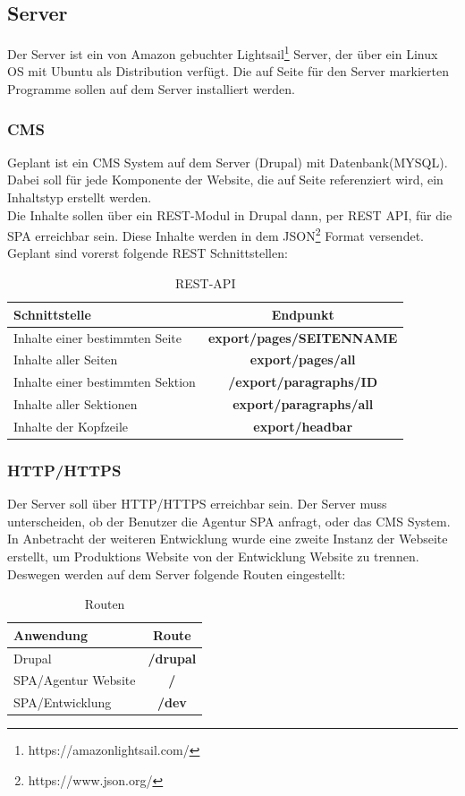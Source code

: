 \documentclass[11pt,a4paper]{article}
\begin{document}
\subsection{Server}
Der Server ist ein von Amazon gebuchter Lightsail\footnote{https://amazonlightsail.com/} Server, der über ein Linux OS mit Ubuntu als Distribution verfügt. Die auf Seite \pageref{sec:progs} für den Server markierten Programme sollen auf dem Server installiert werden.
\subsubsection{CMS}
Geplant ist ein CMS System auf dem Server (Drupal) mit Datenbank(MYSQL).\\ Dabei soll für jede Komponente der Website, die auf Seite \pageref{sec:epage}
referenziert wird, ein Inhaltstyp erstellt werden.\\
Die Inhalte sollen über ein REST-Modul in Drupal dann, per REST \acs{API}, für die SPA erreichbar sein.
Diese Inhalte werden in dem JSON\footnote{https://www.json.org/} Format versendet.
Geplant sind vorerst folgende REST Schnittstellen:
\begin{table}[!ht]
  \centering
     \begin{tabular}{l|c}
       \textbf{Schnittstelle}  & \textbf{Endpunkt} \\
       \hline
       Inhalte einer bestimmten Seite & \textbf{export/pages/SEITENNAME} \\
       Inhalte aller Seiten & \textbf{export/pages/all} \\
       Inhalte einer bestimmten Sektion & \textbf{/export/paragraphs/ID} \\
       Inhalte aller Sektionen & \textbf{export/paragraphs/all}\\
       Inhalte der Kopfzeile & \textbf{export/headbar}\\
     \end{tabular}
\caption{REST-API}
\end{table}
\subsubsection{HTTP/HTTPS}
Der Server soll über HTTP/HTTPS erreichbar sein. Der Server muss unterscheiden, ob der Benutzer die Agentur SPA anfragt, oder das CMS System. In Anbetracht der weiteren Entwicklung wurde eine zweite Instanz der Webseite erstellt, um Produktions Website von der Entwicklung Website zu trennen. Deswegen werden auf dem Server folgende Routen eingestellt:
\begin{table}[!ht]
  \centering
     \begin{tabular}{l|c}
       \textbf{Anwendung}  & \textbf{Route} \\
       \hline
       Drupal & \textbf{/drupal}\\
       SPA/Agentur Website & \textbf{/}\\
       SPA/Entwicklung & \textbf{/dev}\\
     \end{tabular}
\caption{Routen}
\end{table}
\end{document}
